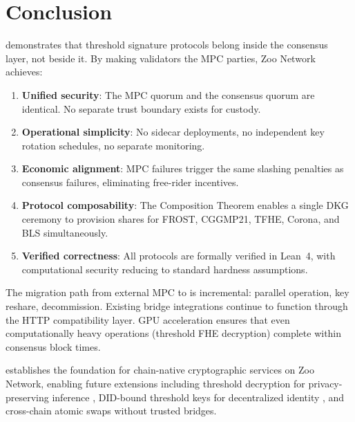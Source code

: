 \section{Conclusion}

\label{sec:conclusion}

\TChain{} demonstrates that threshold signature protocols belong inside the consensus layer, not beside it. By making validators the MPC parties, Zoo Network achieves:

\begin{enumerate}
\item \textbf{Unified security}: The MPC quorum and the consensus quorum are identical. No separate trust boundary exists for custody.
\item \textbf{Operational simplicity}: No sidecar deployments, no independent key rotation schedules, no separate monitoring.
\item \textbf{Economic alignment}: MPC failures trigger the same slashing penalties as consensus failures, eliminating free-rider incentives.
\item \textbf{Protocol composability}: The \LSS{} Composition Theorem enables a single DKG ceremony to provision shares for FROST, CGGMP21, TFHE, Corona, and BLS simultaneously.
\item \textbf{Verified correctness}: All protocols are formally verified in Lean~4, with computational security reducing to standard hardness assumptions.
\end{enumerate}

The migration path from external MPC to \TChain{} is incremental: parallel operation, key reshare, decommission. Existing bridge integrations continue to function through the HTTP compatibility layer. GPU acceleration ensures that even computationally heavy operations (threshold FHE decryption) complete within consensus block times.

\TChain{} establishes the foundation for chain-native cryptographic services on Zoo Network, enabling future extensions including threshold decryption for privacy-preserving inference \cite{zoo-fhe}, DID-bound threshold keys for decentralized identity \cite{zoo-identity-chain}, and cross-chain atomic swaps without trusted bridges.

